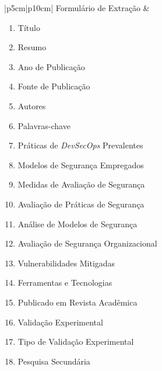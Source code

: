 \begin{longtable}{|p{5cm}|p{10cm}|}
    Formulário de Extração &
    \begin{minipage}[t]{\linewidth}
      \begin{enumerate}[leftmargin=*, label=\arabic*.]
        \item Título
        \item Resumo
        \item Ano de Publicação
        \item Fonte de Publicação
        \item Autores
        \item Palavras-chave
        \item Práticas de \textit{DevSecOps} Prevalentes
        \item Modelos de Segurança Empregados
        \item Medidas de Avaliação de Segurança
        \item Avaliação de Práticas de Segurança
        \item Análise de Modelos de Segurança
        \item Avaliação de Segurança Organizacional
        \item Vulnerabilidades Mitigadas
        \item Ferramentas e Tecnologias
        \item Publicado em Revista Acadêmica
        \item Validação Experimental
        \item Tipo de Validação Experimental
        \item Pesquisa Secundária
      \end{enumerate}
    \end{minipage} \\
    \hline
\end{longtable}
\addtocounter{table}{-1}

